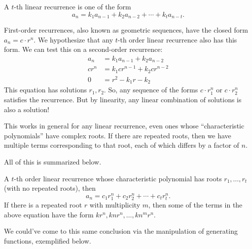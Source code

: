 \documentclass[../m055main.tex]{subfiles}
\begin{document}
\begin{definition}
    A $t$-th linear recurrence is one of the form
    \[ a_n = k_1 a_{n-1} + k_2a_{n-2} + \cdots + k_t a_{n-t}. \]
\end{definition}

First-order recurrences, also known as geometric sequences, have the closed form $a_n = c \cdot r^n$.
We hypothesize that any $t$-th order linear recurrence also has this form.
We can test this on a second-order recurrence:
\begin{align*}
    a_n &= k_1 a_{n-1} + k_2 a_{n-2} \\
    c r^{n} &= k_1 cr^{n-1} + k_2 cr^{n-2} \\
    0 &= r^2 - k_1 r - k_2
\end{align*}
This equation has solutions $r_1, r_2$.
So, any sequence of the forms $c \cdot r_1^{n}$ or $c \cdot r_2^{n}$ satisfies the recurrence.
But by linearity, any linear combination of solutions is also a solution!

This works in general for any linear recurrence, even ones whose ``characteristic polynomials'' have complex roots.
If there are repeated roots, then we have multiple terms corresponding to that root, each of which differs by a factor of $n$.

All of this is summarized below.

\begin{theorem}
    A $t$-th order linear recurrence whose characteristic polynomial has roots $r_1, \ldots, r_t$ (with no repeated roots), then
    \[ a_n = c_1 r_1^{n} + c_2 r_2^{n} + \cdots + c_t r_t^{n}. \]
    If there is a repeated root $r$ with multiplicity $m$, then some of the terms in the above equation have the form $k r^{n}, k n r^{n}, \ldots, k n^{m} r^{n}$.
\end{theorem}

We could've come to this same conclusion via the manipulation of generating functions, exemplified below.
\end{document}
